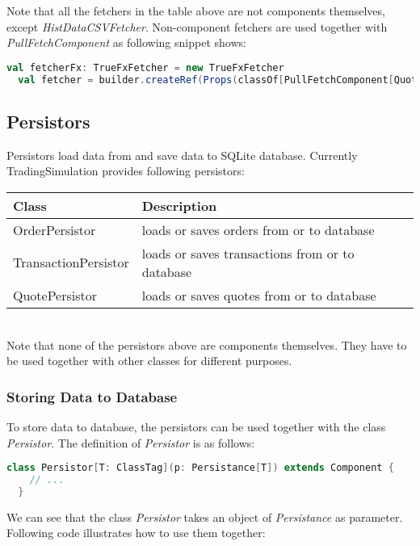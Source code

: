 Note that all the fetchers in the table above are not components themselves, except \emph{HistDataCSVFetcher}. Non-component fetchers are used together with \emph{PullFetchComponent} as following snippet shows:

\begin{lstlisting}[language=Scala]
  val fetcherFx: TrueFxFetcher = new TrueFxFetcher
  val fetcher = builder.createRef(Props(classOf[PullFetchComponent[Quote]], fetcherFx, implicitly[ClassTag[Quote]]), "TrueFxFetcher")
\end{lstlisting}

\subsection{Persistors}

Persistors load data from and save data to SQLite database. Currently TradingSimulation provides following persistors:

\noindent
\begin{tabularx}{\textwidth}{|l|X|}
  \hline
  Class & Description  \\
  \hline
  OrderPersistor & loads or saves orders from or to database \\
  \hline
  TransactionPersistor  & loads or saves transactions from or to database  \\
  \hline
  QuotePersistor & loads or saves quotes from or to database  \\
  \hline
\end{tabularx}\\[0.3cm]

Note that none of the persistors above are components themselves. They have to be used together with other classes for different purposes.

\subsubsection{Storing Data to Database}

To store data to database, the persistors can be used together with the class \emph{Persistor}. The definition of \emph{Persistor} is as follows:

\begin{lstlisting}[language=Scala]
  class Persistor[T: ClassTag](p: Persistance[T]) extends Component {
    // ...
  }
\end{lstlisting}

We can see that the class \emph{Persistor} takes an object of \emph{Persistance} as parameter. Following code illustrates how to use them together:

